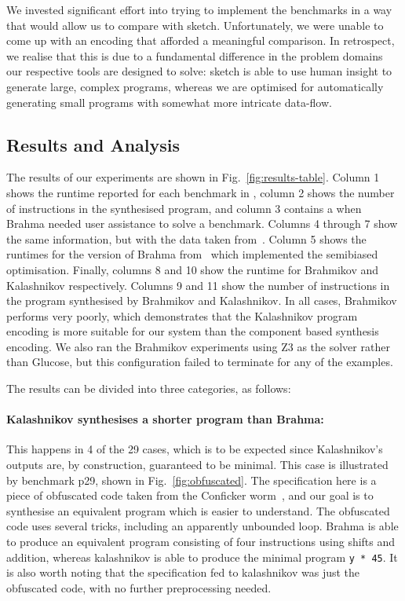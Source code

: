 We invested significant effort into trying to implement the benchmarks in a way
that would allow us to compare with {\sc sketch}. Unfortunately, we were unable to come up
with an encoding that afforded a meaningful comparison.  In retrospect,
we realise that this is due to a fundamental difference in the problem domains
our respective tools are designed to solve: {\sc sketch} is able to use
human insight to generate large, complex programs, whereas we are optimised for 
automatically generating small programs with somewhat more intricate data-flow.


\subsection{Results and Analysis}
The results of our experiments are shown in Fig.~\ref{fig:results-table}.
Column 1 shows the runtime reported for each benchmark in \cite{brahma}, column 2
shows the number of instructions in the synthesised program, and column 3 contains a \xmark\;when
{\sc Brahma} needed user assistance to solve a benchmark.
Columns 4 through 7 show the same information, but with the data taken from~\cite{brahma-icse}.
Column 5 shows the runtimes for the version of {\sc Brahma} from~\cite{brahma-icse} which
implemented the semibiased optimisation.
Finally, columns 8 and 10 show the runtime for {\sc Brahmikov} and {\sc Kalashnikov} respectively.
Columns 9 and 11 show the number of instructions
in the program synthesised by {\sc Brahmikov} and {\sc Kalashnikov}.  In all cases,
{\sc Brahmikov} performs very poorly, which demonstrates that the {\sc Kalashnikov} program
encoding is more suitable for our system than the component based synthesis encoding.
We also ran the {\sc Brahmikov} experiments using Z3 as the solver rather than Glucose,
but this configuration failed to terminate for any of the examples.

The results can be divided into three categories, as follows:


\paragraph{\bf {\sc Kalashnikov} synthesises a shorter program than {\sc Brahma}:}
This happens in 4 of the 29 cases, which is to be expected since {\sc Kalashnikov}'s outputs
are, by construction, guaranteed to be minimal.  This case is illustrated by benchmark p29, shown in Fig.~\ref{fig:obfuscated}.
The specification here is a piece of obfuscated code taken from the Conficker worm~\cite{conficker}, and
our goal is to synthesise an equivalent program which is easier to understand.  The obfuscated code
uses several tricks, including an apparently unbounded loop.  {\sc Brahma} is able to
produce an equivalent program consisting of four instructions using shifts and addition, whereas {\sc kalashnikov}
is able to produce the minimal program \verb|y * 45|.  It is also worth noting that the specification
fed to {\sc kalashnikov} was just the obfuscated code, with no further preprocessing needed.
